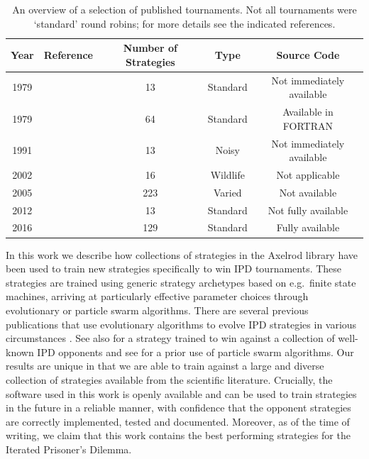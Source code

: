 \documentclass{article}
\begin{document}
\begin{table}[!hbtp]
    \begin{center}
        \begin{tabular}{ccccc}
            \toprule
            Year     & Reference                  & Number of Strategies & Type     & Source Code\\
            \midrule
            1979     & \cite{Axelrod1980a}        & 13                   & Standard & Not immediately available\\
            1979     & \cite{Axelrod1980b}        & 64                   & Standard & Available in FORTRAN\\
            1991     & \cite{Bendor1991}          & 13                   & Noisy    & Not immediately available\\
            2002     & \cite{Stephens2002}        & 16                   & Wildlife & Not applicable\\
            2005     & \cite{kendall2007iterated} & 223                  & Varied   & Not available \\
            2012     & \cite{Stewart2012}         & 13                   & Standard & Not fully available \\
            2016     & \cite{knight2016open}       & 129                  & Standard & Fully available \\
            \bottomrule
        \end{tabular}
    \end{center}
    \caption{An overview of a selection of published tournaments. Not all
             tournaments were `standard' round robins; for more details
             see the indicated references.}\label{tbl:tournaments}
\end{table}

In this work we describe how collections of strategies in the Axelrod library
have been used to train new strategies specifically to win IPD tournaments.
These strategies are trained using generic strategy archetypes based on e.g.\
finite state
machines, arriving at particularly effective parameter choices through
evolutionary or particle swarm algorithms. There are several
previous publications that use evolutionary algorithms to
evolve IPD strategies in various circumstances
\cite{ashlock2006training, Ashlock2015, Ashlock2006,
      ashlock2014shaped, Ashlock2014, barlow2015varying,
      fogel1993evolving, marks1989niche, sudo2015effects,
      vassiliades2010multiagent}. See also \cite{Gaudesi2016} for a
strategy trained to win against a collection of well-known IPD opponents and see
\cite{franken2005particle} for a prior use of particle swarm algorithms. Our
results are unique in that we are able to train against a large and diverse
collection of strategies available from the scientific literature.
Crucially, the
software used in this work is openly available and can be used to train strategies
in the future in a reliable manner, with confidence that the opponent strategies
are correctly implemented, tested and documented.
Moreover, as of the time of writing, we claim that this work contains the best
performing strategies for the Iterated Prisoner's Dilemma.
\end{document}
